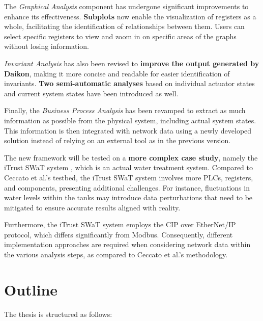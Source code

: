 The \textit{Graphical Analysis} component has undergone significant improvements to enhance its effectiveness. \textbf{Subplots} now enable the visualization of registers as a whole, facilitating the identification of relationships between them. Users can select specific registers to view and zoom in on specific areas of the graphs without losing information.

\textit{Invariant Analysis} has also been revised to \textbf{improve the output generated by Daikon}, making it more concise and readable for easier identification of invariants. \textbf{Two semi-automatic analyses} based on individual actuator states and current system states have been introduced as well.

Finally, the \textit{Business Process Analysis} has been revamped to extract as much information as possible from the physical system, including actual system states. This information is then integrated with network data using a newly developed solution instead of relying on an external tool as in the previous version.

\bigskip
The new framework will be tested on a \textbf{more complex case study}, namely the iTrust SWaT system \cite{swat_home}, which is an actual water treatment system. Compared to Ceccato et al.'s testbed, the iTrust SWaT system involves more PLCs, registers, and components, presenting additional challenges. For instance, fluctuations in water levels within the tanks may introduce data perturbations that need to be mitigated to ensure accurate results aligned with reality.

Furthermore, the iTrust SWaT system employs the CIP over EtherNet/IP protocol, which differs significantly from Modbus. Consequently, different implementation approaches are required when considering network data within the various analysis steps, as compared to Ceccato et al.'s methodology.

\section*{Outline}
\label{sec:1_outline}
\noindent The thesis is structured as follows:

